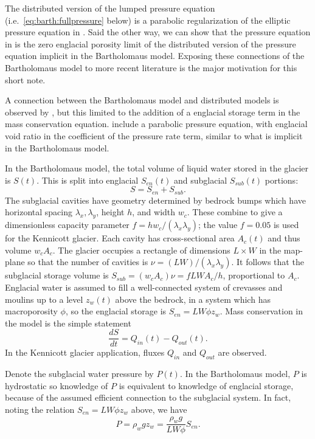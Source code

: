\documentclass[review,letterpaper]{igs}
\begin{document}
The distributed version of the lumped pressure equation (i.e.~\eqref{eq:barth:fullpressure} below) is a parabolic regularization of the elliptic pressure equation in \cite{Schoofetal2012}.  Said the other way, we can show that the pressure equation in \cite{Schoofetal2012} is the zero englacial porosity limit of the distributed version of the pressure equation implicit in the Bartholomaus model.  Exposing these connections of the Bartholomaus model to more recent literature is the major motivation for this short note.

A connection between the Bartholomaus model and distributed models is observed by \cite{Hewitt2013}, but this limited to the addition of a englacial storage term in the mass conservation equation.  \cite{Werderetal2013} include a parabolic pressure equation, with englacial void ratio in the coefficient of the pressure rate term, similar to what is implicit in the Bartholomaus model.

In the Bartholomaus model, the total volume of liquid water stored in the glacier is $S(t)$.  This is split into englacial $S_{en}(t)$ and subglacial $S_{sub}(t)$ portions:
\begin{equation}
S = S_{en} + S_{sub}.  \label{eq:barth:kinematics}
\end{equation}
The subglacial cavities have geometry determined by bedrock bumps which have horizontal spacing $\lambda_x,\lambda_y$, height $h$, and width $w_c$.  These combine to give a dimensionless capacity parameter $f=h w_c/(\lambda_x \lambda_y)$; the value $f=0.05$ is used for the Kennicott glacier.  Each cavity has cross-sectional area $A_c(t)$ and thus volume $w_c A_c$.  The glacier occupies a rectangle of dimensions $L\times W$ in the map-plane so that the number of cavities is $\nu = (LW)/(\lambda_x\lambda_y)$.  It follows that the subglacial storage volume is $S_{sub} = (w_c A_c) \nu = f L W A_c / h$, proportional to $A_c$.  Englacial water is assumed to fill a well-connected system of crevasses and moulins up to a level $z_w(t)$ above the bedrock, in a system which has macroporosity $\phi$, so the englacial storage is $S_{en}=L W \phi z_w$.  Mass conservation in the model is the simple statement \citep{Bartholomausetal2008}
\begin{equation}
\frac{dS}{dt} = Q_{in}(t) - Q_{out}(t). \label{eq:barth:massconserve}
\end{equation}
In the Kennicott glacier application, fluxes $Q_{in}$ and $Q_{out}$ are observed.

Denote the subglacial water pressure by $P(t)$.  In the Bartholomaus model, $P$ is hydrostatic so knowledge of $P$ is equivalent to knowledge of englacial storage, because of the assumed efficient connection to the subglacial system.  In fact, noting the relation $S_{en}=L W \phi z_w$ above, we have
\begin{equation}
P = \rho_w g z_w = \frac{\rho_w g}{LW\phi} S_{en}.  \label{eq:barth:englacialpressure}
\end{equation}
\end{document}
